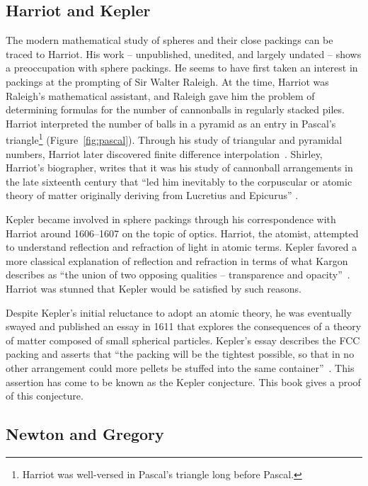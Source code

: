 \figKSOEMIZ %

\subsection{Harriot and Kepler}

The modern mathematical study of spheres and their close packings can
be traced to Harriot.  His work -- unpublished, unedited, and largely
undated -- shows a preoccupation with sphere packings.  He seems to
have first taken an interest in packings at the prompting of Sir
Walter Raleigh.  At the time, Harriot was Raleigh's mathematical
assistant, and Raleigh gave him the problem of determining formulas
for the number of cannonballs in regularly stacked piles.  Harriot
interpreted the number of balls in a pyramid as an entry in Pascal's
triangle\footnote{Harriot was well-versed in Pascal's triangle long
  before Pascal.} (Figure~\ref{fig:pascal}). Through his study of
triangular and pyramidal numbers, Harriot later discovered finite
difference interpolation~\cite{BeS08}.  Shirley, Harriot's biographer,
writes that it was his study of cannonball arrangements in the late
sixteenth century that ``led him inevitably to the corpuscular or
atomic theory of matter originally deriving from Lucretius and
Epicurus'' \cite[p.~242]{Shi83}.

\figBDCABIA %

Kepler became involved in sphere packings through his correspondence
with Harriot around 1606--1607 on the topic of optics.
Harriot, the atomist, attempted to understand reflection and refraction
of light in atomic terms.  Kepler favored a more classical explanation of
reflection and refraction in terms of what Kargon describes as ``the union of two opposing
qualities -- transparence and opacity''~\cite[p.26]{Kar66}.  
Harriot was stunned that
Kepler would be satisfied by such reasons.

Despite Kepler's initial reluctance to adopt an atomic
theory, he was eventually swayed and  published an essay in  1611
that explores the consequences of a theory of matter composed of small
spherical particles. 
Kepler's essay describes the FCC packing and asserts
that ``the packing will be the tightest possible, so that in no other
arrangement could more pellets be stuffed into the same
container''~\cite{Kep66}.  This assertion has come to be known as the
Kepler conjecture.  This book
gives a proof of this conjecture.

\subsection{Newton and Gregory}

